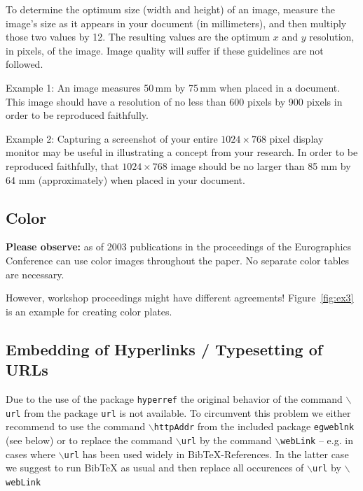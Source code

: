 To determine the optimum size (width and height) of an image, measure
the image's size as it appears in your document (in millimeters), and
then multiply those two values by 12. The resulting values are the
optimum $x$ and $y$ resolution, in pixels, of the image. Image quality
will suffer if these guidelines are not followed.

Example 1: 
%
An image measures 50\,mm by 75\,mm when placed in a document. This
image should have a resolution of no less than 600 pixels by 900
pixels in order to be reproduced faithfully.

Example 2: 
%
Capturing a screenshot of your entire $1024 \times 768$ pixel display
monitor may be useful in illustrating a concept from your research. In
order to be reproduced faithfully, that $1024 \times 768$ image should
be no larger than 85 mm by 64 mm (approximately) when placed in your
document.


\subsection{Color}

\textbf{Please observe:} as of 2003 publications in the proceedings of the
Eurographics Conference can use color images throughout the paper. No
separate color tables are necessary.

However, workshop proceedings might have different agreements! 
Figure~\ref{fig:ex3} is an example for creating color plates.

\subsection{Embedding of Hyperlinks / Typesetting of URLs}

Due to the use of the package \texttt{hyperref} the original behavior
of the command $\backslash$\texttt{url} from the package \texttt{url}
is not available. To circumvent this problem we either recommend to
use the command $\backslash$\texttt{httpAddr} from the 
included package \texttt{egweblnk} (see below) or to replace the
command $\backslash$\texttt{url} by the command $\backslash$\texttt{webLink} 
-- e.g. in cases where $\backslash$\texttt{url} has been used
widely in BibTeX-References. In the latter case we suggest to run
BibTeX as usual and then replace all occurences of $\backslash$\texttt{url}  by
$\backslash$\texttt{webLink}


